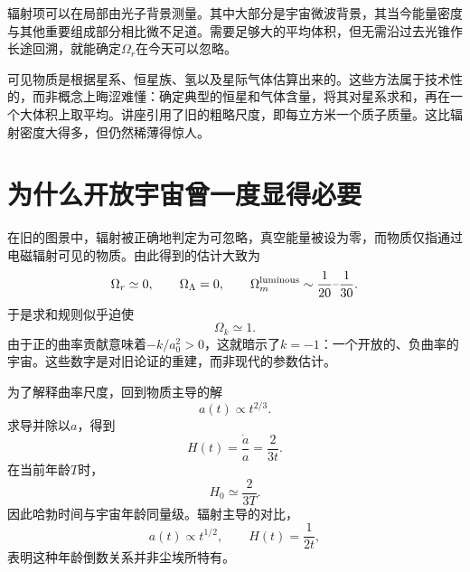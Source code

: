 \begin{classroomqa}
\end{classroomqa}

辐射项可以在局部由光子背景测量。其中大部分是宇宙微波背景，其当今能量密度与其他重要组成部分相比微不足道。需要足够大的平均体积，但无需沿过去光锥作长途回溯，就能确定\(\Omega_r\)在今天可以忽略。

可见物质是根据星系、恒星族、氢以及星际气体估算出来的。这些方法属于技术性的，而非概念上晦涩难懂：确定典型的恒星和气体含量，将其对星系求和，再在一个大体积上取平均。讲座引用了旧的粗略尺度，即每立方米一个质子质量。这比辐射密度大得多，但仍然稀薄得惊人。

\begin{classroomqa}
\end{classroomqa}

\section{为什么开放宇宙曾一度显得必要}

在旧的图景中，辐射被正确地判定为可忽略，真空能量被设为零，而物质仅指通过电磁辐射可见的物质。由此得到的估计大致为
\begin{equation}
\Omega_r\simeq0,
\qquad
\Omega_\Lambda=0,
\qquad
\Omega_m^{\rm luminous}\sim\frac{1}{20}\text{--}\frac{1}{30}.
\end{equation}
于是求和规则似乎迫使
\begin{equation}
\Omega_k\simeq1.
\end{equation}
由于正的曲率贡献意味着\(-k/a_0^2>0\)，这就暗示了\(k=-1\)：一个开放的、负曲率的宇宙。这些数字是对旧论证的重建，而非现代的参数估计。

为了解释曲率尺度，回到物质主导的解
\begin{equation}
a(t)\propto t^{2/3}.
\end{equation}
求导并除以\(a\)，得到
\begin{equation}
H(t)=\frac{\dot a}{a}=\frac{2}{3t}.
\label{eq:c06-matter-h}
\end{equation}
在当前年龄\(T\)时，
\begin{equation}
H_0\simeq\frac{2}{3T}.
\end{equation}
因此哈勃时间与宇宙年龄同量级。辐射主导的对比，
\begin{equation}
a(t)\propto t^{1/2},
\qquad
H(t)=\frac{1}{2t},
\end{equation}
表明这种年龄倒数关系并非尘埃所特有。


